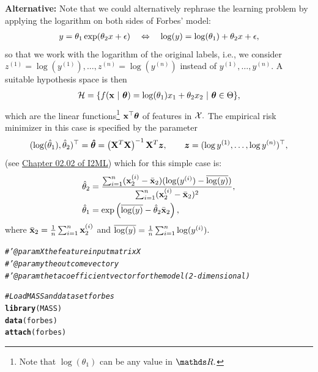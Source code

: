 \documentclass[a4paper]{article}
\makeatletter
\newcommand{\hlcom}[1]{\textcolor[rgb]{0.678,0.584,0.686}{\textit{#1}}}%
\newcommand{\hlstd}[1]{\textcolor[rgb]{0.345,0.345,0.345}{#1}}%
\newcommand{\hlkwd}[1]{\textcolor[rgb]{0.737,0.353,0.396}{\textbf{#1}}}%
\newenvironment{kframe}{%
 \def\at@end@of@kframe{}%
 \ifinner\ifhmode%
  \def\at@end@of@kframe{\end{minipage}}%
  \begin{minipage}{\columnwidth}%
 \fi\fi%
 \def\FrameCommand##1{\hskip\@totalleftmargin \hskip-\fboxsep
 \colorbox{shadecolor}{##1}\hskip-\fboxsep
     \hskip-\linewidth \hskip-\@totalleftmargin \hskip\columnwidth}%
 \MakeFramed {\advance\hsize-\width
   \@totalleftmargin\z@ \linewidth\hsize
   \@setminipage}}%
 {\par\unskip\endMakeFramed%
 \at@end@of@kframe}
\newenvironment{knitrout}{}{} %
\makeatother
\begin{document}
{\begin{enumerate}
\textbf{Alternative:}
Note that we could alternatively rephrase the learning problem by applying the logarithm on both sides of Forbes' model:
%
\begin{align*}
	y =  \theta_1 \exp(\theta_2 x + \eps) 	
	\quad 	\Leftrightarrow \quad 
	\log(y)  =   \log(\theta_1) + \theta_2 x + \eps,
%
\end{align*}
%
so that we work with the logarithm of the original labels, i.e., we consider $z^{(1)} = \log(y^{(1)}),\ldots,z^{(n)}=\log(y^{(n)})$ instead of $y^{(1)},\ldots,y^{(n)}.$
%
A suitable hypothesis space is then
%
\begin{equation*}
	\begin{split}
		\mathcal{H} = \{f(\mathbf{x}~|~ \bm{\theta}) = \log(\theta_1) x_1 + \theta_2 x_2 ~|~   \bm{\theta} \in \Theta \},
	\end{split}
\end{equation*}
%
which are the linear functions\footnote{Note that $\log(\theta_1)$ can be any value in $\R.$} $\mathbf{x}^\top \bm{\theta}$ of features in $\mathcal{X}.$
%
The empirical risk minimizer in this case is specified by the parameter 
%
$$(\log(\hat{\theta}_1),\hat{\theta}_2)^\top = \bm{\hat\theta}=\left(\mathbf{X}^T \mathbf{X}\right)^{-1}\mathbf{X}^T \bm{z}, \qquad  \bm{z} = (\log y^{(1)},\ldots,\log y^{(n)})^\top,$$
%
(see \href{https://slds-lmu.github.io/i2ml/chapters/02_supervised_regression/02-02-linearmodel/}{Chapter 02.02 of I2ML}) which for this simple case is:
%		
		\begin{align*}
%			
			\hat{\theta}_2 &= \frac{\sum_{i=1}^n  (\xi_2  - \bar{\xv}_2 ) ( \log(\yi) - \overline{ \log(y)}    )  }{\sum_{i=1}^n  (\xi_2  - \bar{\xv}_2 )^2}, \\
%			
			\hat{\theta}_1 &= \exp\left(\overline{ \log(y)} -  \hat{\theta}_2 \bar{\xv}_2 \right),
%			 
%			
		\end{align*}
%	
	where $\bar{\mathbf{x}}_2 = \frac1n \sum_{i=1}^n  \mathbf{x}^{(i)}_2$ and $\overline{ \log(y)} =  \frac1n \sum_{i=1}^n  \log(y^{(i)}).$
%	



\begin{knitrout}
\color{fgcolor}\begin{kframe}
\begin{alltt}
\hlcom{#' @param X the feature input matrix X}
\hlcom{#' @param y the outcome vector y}
\hlcom{#' @param theta coefficient vector for the model (2-dimensional)}

\hlcom{# Load MASS and data set forbes}
\hlkwd{library}\hlstd{(MASS)}
\hlkwd{data}\hlstd{(forbes)}
\hlkwd{attach}\hlstd{(forbes)}


\end{alltt}
\end{kframe}
\end{knitrout}
\end{enumerate}}
\end{document}
